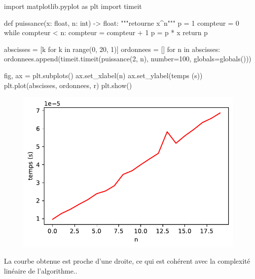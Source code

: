 \documentclass[
  a4paper,
  DIV=11,
  numbers=noendperiod]{scrartcl}
\newenvironment{Shaded}{\begin{snugshade}}{\end{snugshade}}
\newcommand{\BuiltInTok}[1]{\textcolor[rgb]{0.00,0.23,0.31}{#1}}
\newcommand{\CommentTok}[1]{\textcolor[rgb]{0.37,0.37,0.37}{#1}}
\newcommand{\ControlFlowTok}[1]{\textcolor[rgb]{0.00,0.23,0.31}{#1}}
\newcommand{\DecValTok}[1]{\textcolor[rgb]{0.68,0.00,0.00}{#1}}
\newcommand{\ImportTok}[1]{\textcolor[rgb]{0.00,0.46,0.62}{#1}}
\newcommand{\KeywordTok}[1]{\textcolor[rgb]{0.00,0.23,0.31}{#1}}
\newcommand{\NormalTok}[1]{\textcolor[rgb]{0.00,0.23,0.31}{#1}}
\newcommand{\OperatorTok}[1]{\textcolor[rgb]{0.37,0.37,0.37}{#1}}
\newcommand{\StringTok}[1]{\textcolor[rgb]{0.13,0.47,0.30}{#1}}
\begin{document}
\begin{Shaded}
\begin{Highlighting}[]
\ImportTok{import}\NormalTok{ matplotlib.pyplot }\ImportTok{as}\NormalTok{ plt}
\ImportTok{import}\NormalTok{ timeit}

\KeywordTok{def}\NormalTok{ puissance(x: }\BuiltInTok{float}\NormalTok{, n: }\BuiltInTok{int}\NormalTok{) }\OperatorTok{{-}\textgreater{}} \BuiltInTok{float}\NormalTok{:}
    \CommentTok{"""retourne x\^{}n"""}
\NormalTok{    p }\OperatorTok{=} \DecValTok{1}
\NormalTok{    compteur }\OperatorTok{=} \DecValTok{0}
    \ControlFlowTok{while}\NormalTok{ compteur }\OperatorTok{\textless{}}\NormalTok{ n:}
\NormalTok{        compteur }\OperatorTok{=}\NormalTok{ compteur }\OperatorTok{+} \DecValTok{1}
\NormalTok{        p }\OperatorTok{=}\NormalTok{ p }\OperatorTok{*}\NormalTok{ x}
    \ControlFlowTok{return}\NormalTok{ p}

\NormalTok{abscisses }\OperatorTok{=}\NormalTok{ [k }\ControlFlowTok{for}\NormalTok{ k }\KeywordTok{in} \BuiltInTok{range}\NormalTok{(}\DecValTok{0}\NormalTok{, }\DecValTok{20}\NormalTok{, }\DecValTok{1}\NormalTok{)]}
\NormalTok{ordonnees }\OperatorTok{=}\NormalTok{ []}
\ControlFlowTok{for}\NormalTok{ n }\KeywordTok{in}\NormalTok{ abscisses:}
\NormalTok{    ordonnees.append(timeit.timeit(}\StringTok{\textquotesingle{}puissance(2, n)\textquotesingle{}}\NormalTok{, number}\OperatorTok{=}\DecValTok{100}\NormalTok{, }\BuiltInTok{globals}\OperatorTok{=}\BuiltInTok{globals}\NormalTok{()))}

\NormalTok{fig, ax }\OperatorTok{=}\NormalTok{ plt.subplots()}
\NormalTok{ax.set\_xlabel(}\StringTok{\textquotesingle{}n\textquotesingle{}}\NormalTok{)}
\NormalTok{ax.set\_ylabel(}\StringTok{\textquotesingle{}temps (s)\textquotesingle{}}\NormalTok{)}
\NormalTok{plt.plot(abscisses, ordonnees, }\StringTok{\textquotesingle{}r\textquotesingle{}}\NormalTok{)}
\NormalTok{plt.show()}
\end{Highlighting}
\end{Shaded}

\begin{figure}[H]

{\centering \includegraphics{generalites_files/figure-pdf/cell-2-output-1.pdf}

}

\end{figure}

La courbe obtenue est proche d'une droite, ce qui est cohérent avec la
complexité linéaire de l'algorithme..
\end{document}
